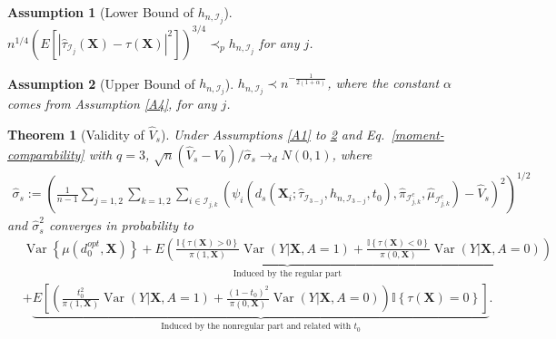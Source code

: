 \documentclass[11pt]{article}
\theoremstyle{referenceplain}
\newtheorem{theorem}{Theorem}
\newtheorem{Assumption}{Assumption}
\theoremstyle{referencedefinition}
\theoremstyle{referenceremark}
\begin{document}


\begin{Assumption}[Lower Bound of $h_{n,\mathcal{I}_j}$]\label{A5}
    $n^{1/4}\left(E[|\widehat{\tau}_{\mathcal{I}_j}(\mathbf{X})-\tau(\mathbf{X})|^2]\right)^{3/4}\prec_p h_{n,\mathcal{I}_j}$  for any $j$.
\end{Assumption}
\begin{Assumption}[Upper Bound of $h_{n,\mathcal{I}_j}$]\label{A6}
    $h_{n,\mathcal{I}_j}\prec n^{-\frac{1}{2(1+\alpha)}}$, where the constant $\alpha$ comes from Assumption \ref{A4}, for any $j$.
\end{Assumption}
\begin{theorem}[Validity of $\widehat{V}_{s}$]\label{thm1}
    Under Assumptions \ref{A1} to \ref{A6} and Eq.~\eqref{moment-comparability} with $q=3$, $\sqrt{n}(\widehat{V}_{s}-V_0)/\widehat{\sigma}_{s}\to_d N(0,1)$, where \begin{align*}
     \widehat{\sigma}_{s}:=\left(\frac{1}{n-1}\sum_{j=1,2}\sum_{k=1,2}\sum_{i\in\mathcal{I}_{j,k}}\left(\psi_i(d_{s}(\mathbf{X}_i;\widehat{\tau}_{\mathcal{I}_{3-j}},h_{n,\mathcal{I}_{3-j}},t_0),\widehat{\pi}_{\mathcal{I}_{j,k}^c},\widehat{\mu}_{\mathcal{I}_{j,k}^c})-\widehat{V}_{s}\right)^2\right)^{1/2}
 \end{align*} 
 and $ \widehat{\sigma}_{s}^2$ converges in probability to
 \begin{align*}
     &\underbrace{\operatorname{Var}\left\{\mu\left(d_0^{o p t}, \mathbf{X}\right)\right\} + E\left(\frac{\mathbb{I}\left\{\tau\left(\mathbf{X}\right)>0\right\}}{\pi\left(1, \mathbf{X}\right)}\operatorname{Var}(Y|\mathbf{X},A=1)+\frac{\mathbb{I}\left\{\tau\left(\mathbf{X}\right)<0\right\}}{\pi\left(0, \mathbf{X}\right)}\operatorname{Var}(Y|\mathbf{X},A=0)\right)}_{\text{Induced by the regular part}}\\
    &+ \underbrace{E\left[\left(\frac{t_0^2}{\pi\left(1, \mathbf{X}\right)}\operatorname{Var}(Y|\mathbf{X},A=1)+\frac{(1-t_0)^2}{\pi\left(0, \mathbf{X}\right)}\operatorname{Var}(Y|\mathbf{X},A=0)\right) \mathbb{I}\left\{\tau\left(\mathbf{X}\right)=0\right\}\right]}_{\text{Induced by the nonregular part and related with $t_0$}}.
 \end{align*}
\end{theorem}
\end{document}
